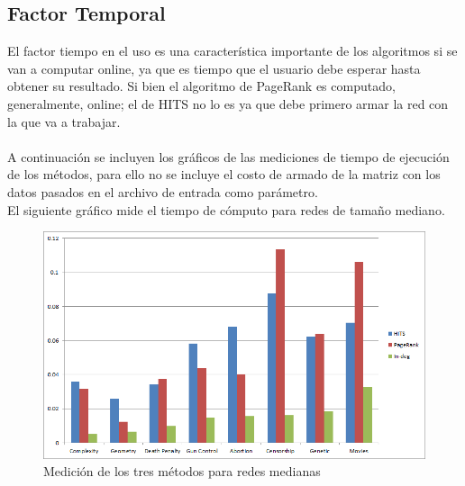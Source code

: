 \documentclass[a4paper]{article}
\begin{document}
\subsection{Factor Temporal}
\indent El factor tiempo en el uso es una caracter\'istica importante de los algoritmos si se van a computar online, ya que es tiempo que el usuario debe esperar hasta obtener su resultado. Si bien el algoritmo de PageRank es computado, generalmente, online; el de HITS no lo es ya que debe primero armar la red con la que va a trabajar.\\
\\
\indent A continuaci\'on se incluyen los gr\'aficos de las mediciones de tiempo de ejecuci\'on de los m\'etodos, para ello no se incluye el costo de armado de la matriz con los datos pasados en el archivo de entrada como par\'ametro.\\
El siguiente gr\'afico mide el tiempo de c\'omputo para redes de tama\~no mediano.

\begin{figure}[h!]
  \begin{center}
	\includegraphics[scale=0.50]{imagenes/expTiempo/tiemposMedianos.png}
	\caption{Medici\'on de los tres m\'etodos para redes medianas}
	\label{nombreparareferenciar}
  \end{center}
\end{figure}
\end{document}
